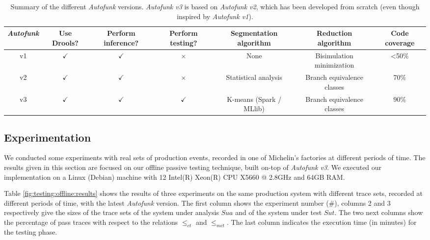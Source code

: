 \begin{sidewaystable}
\begin{center}
    \begin{tabular}{| c | c | c | c | c | c | c |}
        \hline
        \emph{Autofunk} & Use Drools? & Perform inference? & Perform testing? & Segmentation algorithm & Reduction algorithm & Code coverage\\
        \hline
        \hline
        v1 & $\checkmark$ & $\checkmark$ & $\times$ & None & Bisimulation minimization & <50\%\\
        \hline
        v2 & $\checkmark$ & $\checkmark$ & $\times$ & Statistical analysis & Branch equivalence classes & 70\%\\
        \hline
        v3 & $\checkmark$ & $\checkmark$ & $\checkmark$ & K-means (Spark / MLlib) & Branch equivalence classes & 90\%\\
        \hline
    \end{tabular}
\end{center}

    \caption{Summary of the different \emph{Autofunk} versions.
    \emph{Autofunk v3} is based on \emph{Autofunk v2}, which
    has been developed from scratch (even though inspired by
    \emph{Autofunk v1}).}

    \label{fig:autofunk-versions}
\end{sidewaystable}

\subsection{Experimentation}

We conducted some experiments with real sets of production
events, recorded in one of Michelin's factories at different
periods of time. The results given in this section are focused on
our offline passive testing technique, built on-top of
\emph{Autofunk v3}. We executed our implementation on a Linux
(Debian) machine with 12 Intel(R) Xeon(R) CPU X5660 @ 2.8GHz and
64GB RAM.

Table \ref{fig:testing:offline:results} shows the results of
three experiments on the same production system with different
trace sets, recorded at different periods of time, with the
latest \emph{Autofunk} version. The first column shows the
experiment number (\#), columns 2 and 3 respectively give the
sizes of the trace sets of the system under analysis
$\mathit{Sua}$ and of the system under test $\mathit{Sut}$. The
two next columns show the percentage of pass traces with respect
to the relations $\leq_{ct}$ and $\leq_{mct}$. The last column
indicates the execution time (in minutes) for the testing phase.

